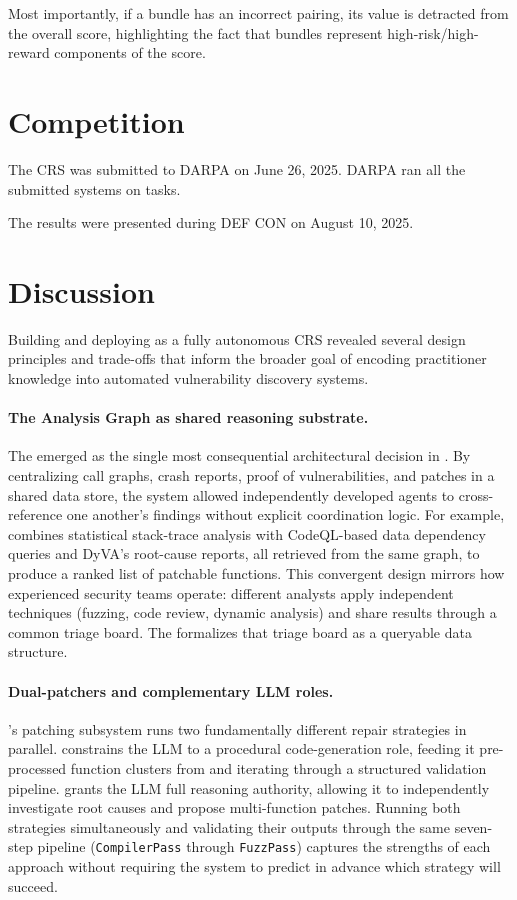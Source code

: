 Most importantly, if a bundle has an incorrect pairing, its value is detracted from the overall score, highlighting the fact that bundles represent high-risk/high-reward components of the score.

\section{Competition}
\label{competition}

The \artiphishell CRS was submitted to DARPA on June 26, 2025.
DARPA ran all the submitted systems on \numberoftargets tasks.

The results were presented during DEF CON on August 10, 2025.

\section{Discussion}
\label{discussion}

Building and deploying \artiphishell as a fully autonomous CRS revealed several design principles and trade-offs that inform the broader goal of encoding practitioner knowledge into automated vulnerability discovery systems.

\paragraph{The Analysis Graph as shared reasoning substrate.}
The \analysisgraph emerged as the single most consequential architectural decision in \artiphishell.
By centralizing call graphs, crash reports, proof of vulnerabilities, and patches in a shared data store, the system allowed independently developed agents to cross-reference one another's findings without explicit coordination logic.
For example, \kumushi combines statistical stack-trace analysis with CodeQL-based data dependency queries and DyVA's root-cause reports, all retrieved from the same graph, to produce a ranked list of patchable functions.
This convergent design mirrors how experienced security teams operate: different analysts apply independent techniques (fuzzing, code review, dynamic analysis) and share results through a common triage board.
The \analysisgraph formalizes that triage board as a queryable data structure.

\paragraph{Dual-patchers and complementary LLM roles.}
\artiphishell's patching subsystem runs two fundamentally different repair strategies in parallel.
\patchery constrains the LLM to a procedural code-generation role, feeding it pre-processed function clusters from \kumushi and iterating through a structured validation pipeline.
\patcherq{} grants the LLM full reasoning authority, allowing it to independently investigate root causes and propose multi-function patches.
Running both strategies simultaneously and validating their outputs through the same seven-step pipeline (\texttt{CompilerPass} through \texttt{FuzzPass}) captures the strengths of each approach without requiring the system to predict in advance which strategy will succeed.

